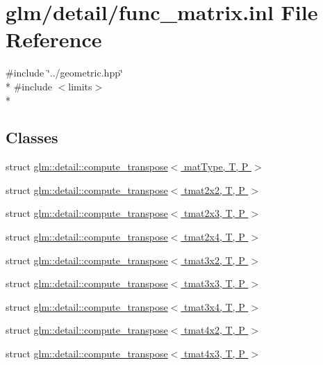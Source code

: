 \hypertarget{func__matrix_8inl}{\section{glm/detail/func\-\_\-matrix.inl File Reference}
\label{func__matrix_8inl}
}
{\ttfamily \#include \char`\"{}../geometric.\-hpp\char`\"{}}\\*
{\ttfamily \#include $<$limits$>$}\\*
\subsection*{Classes}
\begin{DoxyCompactItemize}
\item 
struct \hyperlink{structglm_1_1detail_1_1compute__transpose}{glm\-::detail\-::compute\-\_\-transpose$<$ mat\-Type, T, P $>$}
\item 
struct \hyperlink{structglm_1_1detail_1_1compute__transpose_3_01tmat2x2_00_01T_00_01P_01_4}{glm\-::detail\-::compute\-\_\-transpose$<$ tmat2x2, T, P $>$}
\item 
struct \hyperlink{structglm_1_1detail_1_1compute__transpose_3_01tmat2x3_00_01T_00_01P_01_4}{glm\-::detail\-::compute\-\_\-transpose$<$ tmat2x3, T, P $>$}
\item 
struct \hyperlink{structglm_1_1detail_1_1compute__transpose_3_01tmat2x4_00_01T_00_01P_01_4}{glm\-::detail\-::compute\-\_\-transpose$<$ tmat2x4, T, P $>$}
\item 
struct \hyperlink{structglm_1_1detail_1_1compute__transpose_3_01tmat3x2_00_01T_00_01P_01_4}{glm\-::detail\-::compute\-\_\-transpose$<$ tmat3x2, T, P $>$}
\item 
struct \hyperlink{structglm_1_1detail_1_1compute__transpose_3_01tmat3x3_00_01T_00_01P_01_4}{glm\-::detail\-::compute\-\_\-transpose$<$ tmat3x3, T, P $>$}
\item 
struct \hyperlink{structglm_1_1detail_1_1compute__transpose_3_01tmat3x4_00_01T_00_01P_01_4}{glm\-::detail\-::compute\-\_\-transpose$<$ tmat3x4, T, P $>$}
\item 
struct \hyperlink{structglm_1_1detail_1_1compute__transpose_3_01tmat4x2_00_01T_00_01P_01_4}{glm\-::detail\-::compute\-\_\-transpose$<$ tmat4x2, T, P $>$}
\item 
struct \hyperlink{structglm_1_1detail_1_1compute__transpose_3_01tmat4x3_00_01T_00_01P_01_4}{glm\-::detail\-::compute\-\_\-transpose$<$ tmat4x3, T, P $>$}
\item 

\end{DoxyCompactItemize}
